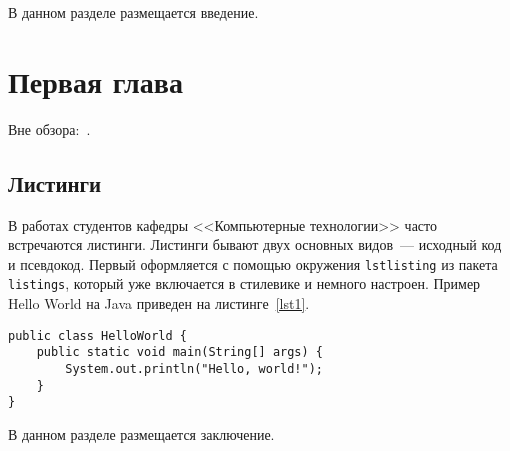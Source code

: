 \documentclass[times]{itmo-student-thesis}
\begin{document}

\tableofcontents

\startprefacepage

В данном разделе размещается введение.

\chapter{Первая глава}

Вне обзора:~\cite{bellman}.

\section{Листинги}

В работах студентов кафедры <<Компьютерные технологии>> часто встречаются листинги. Листинги бывают
двух основных видов~--- исходный код и псевдокод. Первый оформляется с помощью окружения \texttt{lstlisting}
из пакета \texttt{listings}, который уже включается в стилевике и немного настроен. Пример Hello World на Java
приведен на листинге~\ref{lst1}.

\begin{lstlisting}[float=!h,caption={Пример исходного кода на Java},label={lst1}]
public class HelloWorld {
    public static void main(String[] args) {
        System.out.println("Hello, world!");
    }
}
\end{lstlisting}

\startconclusionpage

В данном разделе размещается заключение.

\printmainbibliography

\appendix
\end{document}
